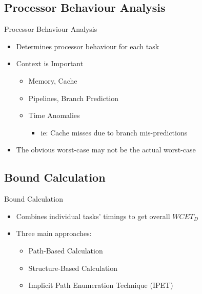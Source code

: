 \documentclass{beamer}
\begin{document}
\subsection{Processor Behaviour Analysis}
\begin{frame}{Processor Behaviour Analysis}
  \begin{itemize}
    \item Determines processor behaviour for each task
    \item Context is Important
      \begin{itemize}
        \item Memory, Cache
        \item Pipelines, Branch Prediction
        \item<3-> Time Anomalies
          \begin{itemize}
            \item<3-> ie: Cache misses due to branch mis-predictions
          \end{itemize}
      \end{itemize}
      \item<2-> The obvious worst-case may not be the actual worst-case
  \end{itemize}
\end{frame}

\subsection{Bound Calculation}
\begin{frame}{Bound Calculation}  
  \begin{itemize}
    \item Combines individual tasks' timings to get overall $WCET_D$
      \pause
    \item Three main approaches:
      \begin{itemize}
        \item Path-Based Calculation
        \item Structure-Based Calculation
        \item Implicit Path Enumeration Technique (IPET)
      \end{itemize}
  \end{itemize}
\end{frame}
\end{document}
